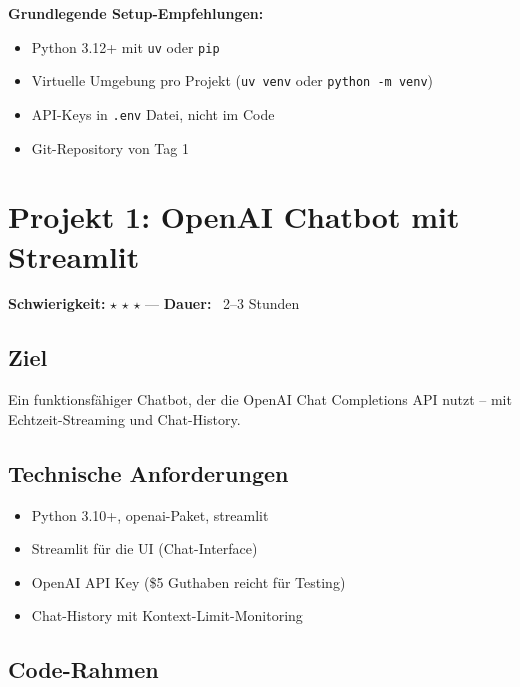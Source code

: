 \textbf{Grundlegende Setup-Empfehlungen:}
\begin{itemize}[leftmargin=*]
    \item Python 3.12+ mit \texttt{uv} oder \texttt{pip}
    \item Virtuelle Umgebung pro Projekt (\texttt{uv venv} oder \texttt{python -m venv})
    \item API-Keys in \texttt{.env} Datei, nicht im Code
    \item Git-Repository von Tag 1
\end{itemize}

\section{Projekt 1: OpenAI Chatbot mit Streamlit}

\textbf{Schwierigkeit: }$\star$ $\star$ $\star$ ---
\textbf{Dauer: }~2--3 Stunden

\subsection*{Ziel}
Ein funktionsfähiger Chatbot, der die OpenAI Chat Completions API nutzt -- mit Echtzeit-Streaming und Chat-History.

\subsection*{Technische Anforderungen}
\begin{itemize}[leftmargin=*]
    \item Python 3.10+, openai-Paket, streamlit
    \item Streamlit für die UI (Chat-Interface)
    \item OpenAI API Key (\$5 Guthaben reicht für Testing)
    \item Chat-History mit Kontext-Limit-Monitoring
\end{itemize}

\subsection*{Code-Rahmen}

